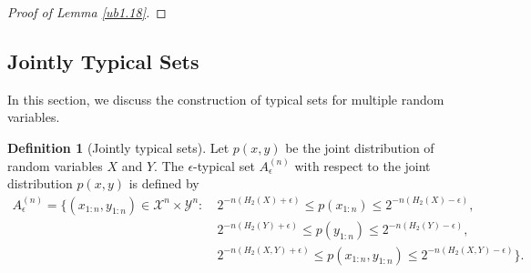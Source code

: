 \documentclass{article}
\numberwithin{equation}{section}
\renewcommand{\cal}{\mathcal}
\theoremstyle{plain}
\theoremstyle{definition}
\newtheorem{definition}[theorem]{Definition}
\begin{document}
\begin{proof}[Proof of Lemma \ref{ub1.18}]

\end{proof}

\newpage
\subsection{Jointly Typical Sets}
In this section, we discuss the construction of typical sets for multiple random variables.
\begin{definition}[Jointly typical sets]
Let $p(x,y)$ be the joint distribution of random variables $X$ and $Y$. The $\epsilon$-typical set $A_\epsilon^{(n)}$ with respect to the joint distribution $p(x,y)$ is defined by
\begin{align*}
	A^{(n)}_\epsilon=\bigl\{(x_{1:n},y_{1:n})\in\cal{X}^n\times\cal{Y}^n:\ &2^{-n(H_2(X)+\epsilon)}\leq p(x_{1:n})\leq 2^{-n(H_2(X)-\epsilon)},\\
	&2^{-n(H_2(Y)+\epsilon)}\leq p(y_{1:n})\leq 2^{-n(H_2(Y)-\epsilon)},\\
	&2^{-n(H_2(X,Y)+\epsilon)}\leq p(x_{1:n},y_{1:n})\leq 2^{-n(H_2(X,Y)-\epsilon)}
	\bigr\}.
\end{align*}
\end{definition}
\end{document}
